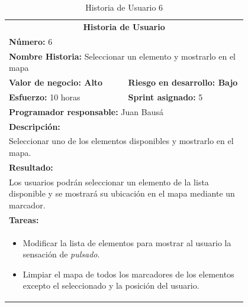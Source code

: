 	\begin{table}[H]
	  \centering 
	 	\begin{tabular}{p{0.4\linewidth}p{0.4\linewidth}}
	    \toprule
	    \multicolumn{2}{c}{\cellcolor{black!30}\textbf{Historia de Usuario}} 													\\
		\multicolumn{2}{l}{\cellcolor{gray!25}\textbf{Número: }6}																\\
		\multicolumn{2}{l}{\textbf{Nombre Historia: } Seleccionar un elemento y mostrarlo en el mapa}							\\
		\cellcolor{gray!25}\textbf{Valor de negocio: Alto}	&	\cellcolor{gray!25}\textbf{Riesgo en desarrollo: Bajo}		\\
		\textbf{Esfuerzo:} 10 horas				&	\textbf{Sprint asignado: }5 												\\
		\multicolumn{2}{l}{\cellcolor{gray!25}\textbf{Programador responsable: }Juan Bausá}									\\
		\multicolumn{2}{l}{\textbf{Descripción:}}                                                     						\\
		\multicolumn{2}{l}{\parbox{15cm}{Seleccionar uno de los elementos disponibles y mostrarlo en el mapa.}}				\\
		\multicolumn{2}{l}{\cellcolor{gray!25}\textbf{Resultado:}}																\\		
		\multicolumn{2}{l}{\parbox{15cm}{Los usuarios podrán seleccionar un elemento de la lista disponible y se mostrará su ubicación en el mapa mediante un marcador.}}																									\\
		\multicolumn{2}{l}{\textbf{Tareas:}}																					\\
		\multicolumn{2}{l}{
			\begin{minipage}{12cm}
	    		\vskip 4pt
	    		\begin{itemize}
	    			\item Modificar la lista de elementos para mostrar al usuario la sensación de \textit{pulsado}.
	    			\item Limpiar el mapa de todos los marcadores de los elementos excepto el seleccionado y la posición del usuario.
				\end{itemize}
			  	\vskip 4pt
		 	\end{minipage}
		} \\																				
	    \hline
	  \end{tabular}
	  \caption{Historia de Usuario 6}
	\end{table}
	
